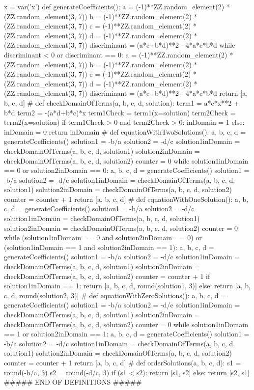 \documentclass{ximera}
\begin{document}
\begin{sagesilent}
x = var('x')
def generateCoefficients(): 
    a = (-1)**ZZ.random_element(2) * (ZZ.random_element(3, 7))
    b = (-1)**ZZ.random_element(2) * (ZZ.random_element(3, 7))
    c = (-1)**ZZ.random_element(2) * (ZZ.random_element(3, 7))
    d = (-1)**ZZ.random_element(2) * (ZZ.random_element(3, 7))
    discriminant = (a*c+b*d)**2 - 4*a*c*b*d
    while discriminant < 0 or discriminant == 0:
        a = (-1)**ZZ.random_element(2) * (ZZ.random_element(3, 7))
        b = (-1)**ZZ.random_element(2) * (ZZ.random_element(3, 7))
        c = (-1)**ZZ.random_element(2) * (ZZ.random_element(3, 7))
        d = (-1)**ZZ.random_element(2) * (ZZ.random_element(3, 7))
        discriminant = (a*c+b*d)**2 - 4*a*c*b*d
    return [a, b, c, d]
#  
def checkDomainOfTerms(a, b, c, d, solution):
    term1 = a*c*x**2 + b*d
    term2 = -(a*d+b*c)*x
    term1Check = term1(x=solution)
    term2Check = term2(x=solution)
    if term1Check > 0 and term2Check > 0:
        inDomain = 1
    else:
        inDomain = 0
    return inDomain
#
def equationWithTwoSolutions():
    a, b, c, d = generateCoefficients()
    solution1 = -b/a
    solution2 = -d/c
    solution1inDomain = checkDomainOfTerms(a, b, c, d, solution1)
    solution2inDomain = checkDomainOfTerms(a, b, c, d, solution2)
    counter = 0
    while solution1inDomain == 0 or solution2inDomain == 0:
        a, b, c, d = generateCoefficients()
        solution1 = -b/a
        solution2 = -d/c
        solution1inDomain = checkDomainOfTerms(a, b, c, d, solution1)
        solution2inDomain = checkDomainOfTerms(a, b, c, d, solution2)
        counter = counter + 1 
    return [a, b, c, d]
#
def equationWithOneSolution():
    a, b, c, d = generateCoefficients()
    solution1 = -b/a
    solution2 = -d/c
    solution1inDomain = checkDomainOfTerms(a, b, c, d, solution1)
    solution2inDomain = checkDomainOfTerms(a, b, c, d, solution2)
    counter = 0
    while (solution1inDomain == 0 and solution2inDomain == 0) or (solution1inDomain == 1 and solution2inDomain == 1):
        a, b, c, d = generateCoefficients()
        solution1 = -b/a
        solution2 = -d/c
        solution1inDomain = checkDomainOfTerms(a, b, c, d, solution1)
        solution2inDomain = checkDomainOfTerms(a, b, c, d, solution2)
        counter = counter + 1 
    if solution1inDomain == 1:
        return [a, b, c, d, round(solution1, 3)]
    else:
        return [a, b, c, d, round(solution2, 3)]
#
def equationWithZeroSolutions():
    a, b, c, d = generateCoefficients()
    solution1 = -b/a
    solution2 = -d/c
    solution1inDomain = checkDomainOfTerms(a, b, c, d, solution1)
    solution2inDomain = checkDomainOfTerms(a, b, c, d, solution2)
    counter = 0
    while solution1inDomain == 1 or solution2inDomain == 1:
        a, b, c, d = generateCoefficients()
        solution1 = -b/a
        solution2 = -d/c
        solution1inDomain = checkDomainOfTerms(a, b, c, d, solution1)
        solution2inDomain = checkDomainOfTerms(a, b, c, d, solution2)
        counter = counter + 1 
    return [a, b, c, d]
#
def orderSolutions(a, b, c, d):
    s1 = round(-b/a, 3)
    s2 = round(-d/c, 3)
    if (s1 < s2):
        return [s1, s2]
    else: 
        return [s2, s1]
##### END OF DEFINITIONS #####


\end{sagesilent}
\end{document}
